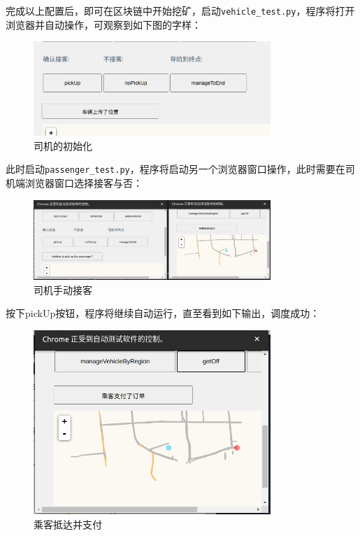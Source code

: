 完成以上配置后，即可在区块链中开始挖矿，启动\verb|vehicle_test.py|，程序将打开浏览器并自动操作，可观察到如下图的字样：

\begin{figure}[htbp]
    \centering
    \includegraphics[width=0.8\textwidth]{images/vehicleInit.png}
    \caption{司机的初始化}\label{司机的初始化} %
\end{figure}

此时启动\verb|passenger_test.py|，程序将启动另一个浏览器窗口操作，此时需要在司机端浏览器窗口选择接客与否：

\begin{figure}[htbp]
    \centering
    \includegraphics[width=0.8\textwidth]{images/pickUp.png}
    \caption{司机手动接客}\label{司机手动接客} %
\end{figure}

按下pickUp按钮，程序将继续自动运行，直至看到如下输出，调度成功：

\begin{figure}[htbp]
    \centering
    \includegraphics[width=0.8\textwidth]{images/passengerPay.png}
    \caption{乘客抵达并支付}\label{司机手动接乘客抵达并支付客} %
\end{figure}

